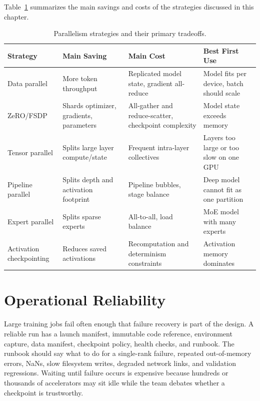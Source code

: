 Table~\ref{tab:parallelism-tradeoffs} summarizes the main savings and costs of the strategies discussed in this chapter.

\begin{table}[t]
\caption{Parallelism strategies and their primary tradeoffs.}
\label{tab:parallelism-tradeoffs}
\small
\begin{tabular}{@{}p{2.5cm}p{2.9cm}p{2.7cm}p{2.8cm}@{}}
\toprule
Strategy & Main Saving & Main Cost & Best First Use \\
\midrule
Data parallel & More token throughput & Replicated model state, gradient all-reduce & Model fits per device, batch should scale \\
ZeRO/FSDP & Shards optimizer, gradients, parameters & All-gather and reduce-scatter, checkpoint complexity & Model state exceeds memory \\
Tensor parallel & Splits large layer compute/state & Frequent intra-layer collectives & Layers too large or too slow on one GPU \\
Pipeline parallel & Splits depth and activation footprint & Pipeline bubbles, stage balance & Deep model cannot fit as one partition \\
Expert parallel & Splits sparse experts & All-to-all, load balance & MoE model with many experts \\
Activation checkpointing & Reduces saved activations & Recomputation and determinism constraints & Activation memory dominates \\
\bottomrule
\end{tabular}
\end{table}

\section{Operational Reliability}
\label{sec:training-operational-reliability}

Large training jobs fail often enough that failure recovery is part of the design. A reliable run has a launch manifest, immutable code reference, environment capture, data manifest, checkpoint policy, health checks, and runbook. The runbook should say what to do for a single-rank failure, repeated out-of-memory errors, NaNs, slow filesystem writes, degraded network links, and validation regressions. Waiting until failure occurs is expensive because hundreds or thousands of accelerators may sit idle while the team debates whether a checkpoint is trustworthy.

